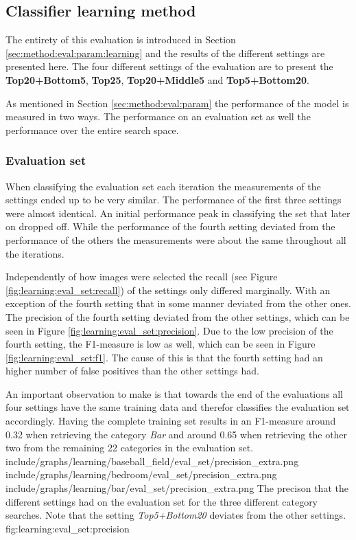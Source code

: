
\subsection{Classifier learning method}
\label{sec:res:learning}

The entirety of this evaluation is introduced in Section \ref{sec:method:eval:param:learning} and the results of the different settings are presented here. 
The four different settings of the evaluation are to present the \textbf{Top20+Bottom5}, \textbf{Top25}, \textbf{Top20+Middle5} and \textbf{Top5+Bottom20}.

As mentioned in Section \ref{sec:method:eval:param} the performance of the model is measured in two ways. The performance on an evaluation set as well the performance over the entire search space.

\subsubsection{Evaluation set}
\label{sec:res:learning:eval}
When classifying the evaluation set each iteration the measurements of the settings ended up to be very similar. The performance of the first three settings were almost identical. An initial performance peak in classifying the set that later on dropped off. While the performance of the fourth setting deviated from the performance of the others the measurements were about the same throughout all the iterations.

Independently of how images were selected the recall (see Figure \ref{fig:learning:eval_set:recall}) of the settings only differed marginally. With an exception of the fourth setting that in some manner deviated from the other ones. 
The precision of the fourth setting deviated from the other settings, which can be seen in Figure \ref{fig:learning:eval_set:precision}. Due to the low precision of the fourth setting, the F1-measure is low as well, which can be seen in Figure \ref{fig:learning:eval_set:f1}. The cause of this is that the fourth setting had an higher number of false positives than the other settings had.

An important observation to make is that towards the end of the evaluations all four settings have the same training data and therefor classifies the evaluation set accordingly. Having the complete training set results in an F1-measure around 0.32 when retrieving the category \emph{Bar} and around 0.65 when retrieving the other two from the remaining 22 categories in the evaluation set.
\tripfigurenear
{include/graphs/learning/baseball_field/eval_set/precision_extra.png}
{include/graphs/learning/bedroom/eval_set/precision_extra.png}
{include/graphs/learning/bar/eval_set/precision_extra.png}
{The precison that the different settings had on the evaluation set for the three different category searches. Note that the setting \emph{Top5+Bottom20} deviates from the other settings.}
{fig:learning:eval_set:precision}

